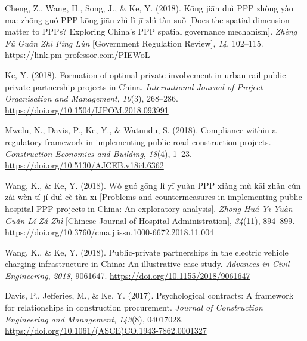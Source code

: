 \documentclass[11pt,a4paper]{report} %
\begin{document}
\begin{tablist}
        \item[2018] \tab{}Cheng, Z., Wang, H., Song, J., \& Ke, Y. (2018). Kōng jiān duì PPP zhòng yào ma: zhōng guó PPP kōng jiān zhì lǐ jī zhì tàn suǒ [Does the spatial dimension matter to PPPs? Exploring China's PPP spatial governance mechanism]. \textit{Zhèng Fǔ Guǎn Zhì Píng Lùn} [Government Regulation Review], \textit{14}, 102--115. \href{https://link.pm-professor.com/PIEWoL}{https://link.pm-professor.com/PIEWoL}
        
        \item[2018] \tab{}Ke, Y. (2018). Formation of optimal private involvement in urban rail public-private partnership projects in China. \textit{International Journal of Project Organisation and Management}, \textit{10}(3), 268--286. \href{https://doi.org/10.1504/IJPOM.2018.093991}{https://doi.org/10.1504/IJPOM.2018.093991}
        
        \item[2018] \tab{}Mwelu, N., Davis, P., Ke, Y., \& Watundu, S. (2018). Compliance within a regulatory framework in implementing public road construction projects. \textit{Construction Economics and Building}, \textit{18}(4), 1--23. \href{https://doi.org/10.5130/AJCEB.v18i4.6362}{https://doi.org/10.5130/AJCEB.v18i4.6362}
        
        \item[2018] \tab{}Wang, K., \& Ke, Y. (2018). Wǒ guó gōng lì yī yuàn PPP xiàng mù kāi zhǎn cún zài wèn tí jí duì cè tàn xī [Problems and countermeasures in implementing public hospital PPP projects in China: An exploratory analysis]. \textit{Zhōng Huá Yī Yuàn Guǎn Lǐ Zá Zhì} [Chinese Journal of Hospital Administration], \textit{34}(11), 894--899. \href{https://doi.org/10.3760/cma.j.issn.1000-6672.2018.11.004}{https://doi.org/10.3760/cma.j.issn.1000-6672.2018.11.004}
        
        \item[2018] \tab{}Wang, K., \& Ke, Y. (2018). Public-private partnerships in the electric vehicle charging infrastructure in China: An illustrative case study. \textit{Advances in Civil Engineering}, \textit{2018}, 9061647. \href{https://doi.org/10.1155/2018/9061647}{https://doi.org/10.1155/2018/9061647}
        
        \item[2017] \tab{}Davis, P., Jefferies, M., \& Ke, Y. (2017). Psychological contracts: A framework for relationships in construction procurement. \textit{Journal of Construction Engineering and Management}, \textit{143}(8), 04017028. \href{https://doi.org/10.1061/(ASCE)CO.1943-7862.0001327}{https://doi.org/10.1061/(ASCE)CO.1943-7862.0001327}
        

\end{tablist}
\end{document}
